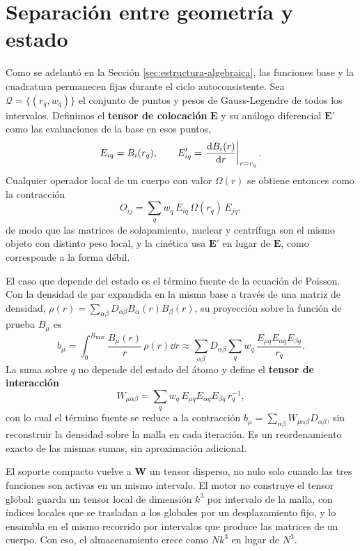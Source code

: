 \section{Separación entre geometría y estado}
\label{sec:tensores_geometria}

Como se adelantó en la Sección \ref{sec:estructura-algebraica}, las funciones base y la cuadratura permanecen fijas durante el ciclo autoconsistente. Sea $\mathcal{Q} = \{(r_q, w_q)\}$ el conjunto de puntos y pesos de Gauss-Legendre de todos los intervalos. Definimos el \textbf{tensor de colocación} $\bm{E}$ y su análogo diferencial $\bm{E}'$ como las evaluaciones de la base en esos puntos,
\begin{equation}
\label{eq:collocation-tensor}
  E_{iq} = B_i(r_q), \qquad E'_{iq} = \eval{\dv{B_i(r)}{r}}_{r=r_q}.
\end{equation}
Cualquier operador local de un cuerpo con valor $\Omega(r)$ se obtiene entonces como la contracción
\begin{equation}
\label{eq:one-body-contraction}
  O_{ij} = \sum_{q} w_q\, E_{iq}\, \Omega(r_q)\, E_{jq},
\end{equation}
de modo que las matrices de solapamiento, nuclear y centrífuga son el mismo objeto con distinto peso local, y la cinética usa $\bm{E}'$ en lugar de $\bm{E}$, como corresponde a la forma débil.

El caso que depende del estado es el término fuente de la ecuación de Poisson. Con la densidad de par expandida en la misma base a través de una matriz de densidad, $\rho(r) = \sum_{\alpha\beta} D_{\alpha\beta} B_\alpha(r) B_\beta(r)$, su proyección sobre la función de prueba $B_\mu$ es
\begin{equation}
  b_\mu = \int_0^{R_{\text{max}}} \frac{B_\mu(r)}{r}\,\rho(r)\dd{r} \approx \sum_{\alpha\beta} D_{\alpha\beta} \sum_q w_q\,\frac{E_{\mu q}E_{\alpha q}E_{\beta q}}{r_q}.
\end{equation}
La suma sobre $q$ no depende del estado del átomo y define el \textbf{tensor de interacción}
\begin{equation}
\label{eq:inter-tensor}
  W_{\mu\alpha\beta} = \sum_{q} w_q\, E_{\mu q} E_{\alpha q} E_{\beta q}\, r_q^{-1},
\end{equation}
con lo cual el término fuente se reduce a la contracción $b_\mu = \sum_{\alpha\beta} W_{\mu\alpha\beta} D_{\alpha\beta}$, sin reconstruir la densidad sobre la malla en cada iteración. Es un reordenamiento exacto de las mismas sumas, sin aproximación adicional.

El soporte compacto vuelve a $\mathbf{W}$ un tensor disperso, no nulo solo cuando las tres funciones son activas en un mismo intervalo. El motor no construye el tensor global: guarda un tensor local de dimensión $k^3$ por intervalo de la malla, con índices locales que se trasladan a los globales por un desplazamiento fijo, y lo ensambla en el mismo recorrido por intervalos que produce las matrices de un cuerpo. Con eso, el almacenamiento crece como $N k^3$ en lugar de $N^3$.

